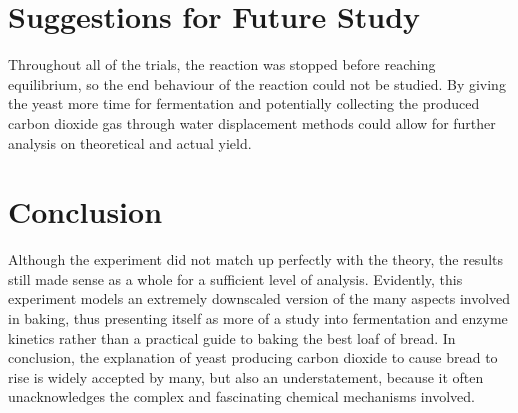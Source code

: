 \documentclass{article}
\begin{document}
\section{Suggestions for Future Study}
Throughout all of the trials, the reaction was stopped before reaching equilibrium, so the end behaviour of the reaction could not be studied. By giving the yeast more time for fermentation and potentially collecting the produced carbon dioxide gas through water displacement methods could allow for further analysis on theoretical and actual yield.

\section{Conclusion}
Although the experiment did not match up perfectly with the theory, the results still made sense as a whole for a sufficient level of analysis. Evidently, this experiment models an extremely downscaled version of the many aspects involved in baking, thus presenting itself as more of a study into fermentation and enzyme kinetics rather than a practical guide to baking the best loaf of bread. In conclusion, the explanation of yeast producing carbon dioxide to cause bread to rise is widely accepted by many, but also an understatement, because it often unacknowledges the complex and fascinating chemical mechanisms involved.

\nocite{*}

\newpage

\printbibliography

\newpage

\captionsetup[table]{name=Appendix}
\setcounter{table}{0}
\end{document}
